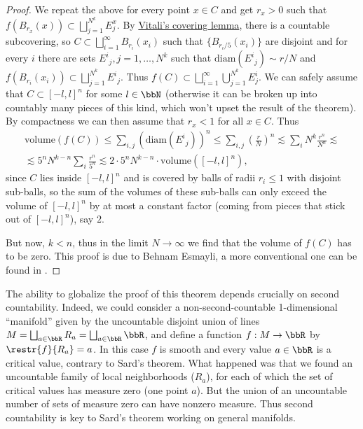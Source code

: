 \begin{proof}
    We repeat the above for every point $x\in C$ and get $r_x>0$ such that $f(B_{r_x}(x))\subset \bigsqcup_{j=1}^{N^k}E_j^x$. By \href{https://en.wikipedia.org/wiki/Vitali_covering_lemma}{Vitali's covering lemma}, there is a countable subcovering, so $C\subset \bigsqcup_{i=1}^\infty B_{r_i}(x_i)$ such that $\{B_{r_i/5}(x_i)\}$ are disjoint and for every $i$ there are sets $E^i{}_j,j=1,\ldots,N^k$ such that $\mathrm{diam}(E^i{}_j)\sim r/N$ and $f(B_{r_i}(x_i))\subset \bigsqcup_{j=1}^{N^k}E^i{}_j$. Thus $f(C)\subset \bigsqcup_{i=1}^\infty\bigcup_{j=1}^{N^k}E_j^i$. We can safely assume that $C\subset [-l,l]^n$ for some $l\in \bbN$ (otherwise it can be broken up into countably many pieces of this kind, which won't upset the result of the theorem). By compactness we can then assume that $r_x<1$ for all $x\in C$. Thus
    \begin{multline}
        \mathrm{volume}(f(C))\leq \sum_{i,j}(\mathrm{diam}(E^i{}_j))^n\leq \sum_{i,j}\left(\frac rN\right)^n\lesssim \sum_{i}N^k\frac{r^n}{N^n}\lesssim \\
        \lesssim 5^nN^{k-n}\sum_i\frac{r^n}{5^n}\lesssim 2\cdot 5^n N^{k-n}\cdot \mathrm{volume}([-l,l]^n),
    \end{multline}
    since $C$ lies inside $[-l,l]^n$ and is covered by balls of radii $r_i\leq 1$ with disjoint sub-balls, so the sum of the volumes of these sub-balls can only exceed the volume of $[-l,l]^n$ by at most a constant factor (coming from pieces that stick out of $[-l,l]^n$), say $2$.

    But now, $k<n$, thus in the limit $N\to \infty$ we find that the volume of $f(C)$ has to be zero. This proof is due to Behnam Esmayli, a more conventional one can be found in \cite[Thm.~6.10]{Lee}.
\end{proof}
\begin{rem}
    The ability to globalize the proof of this theorem depends crucially on second countability. Indeed, we could consider a non-second-countable 1-dimensional ``manifold'' given by the uncountable disjoint union of lines $M=\bigsqcup_{a\in \bbR} R_a=\bigsqcup_{a\in \bbR} \bbR$, and define a function $f:M\to \bbR$ by $\restr{f}{R_a}=a$. In this case $f$ is smooth and every value $a\in\bbR$ is a critical value, contrary to Sard's theorem. What happened was that we found an uncountable family of local neighborhoods ($R_a$), for each of which the set of critical values has measure zero (one point $a$). But the union of an uncountable number of sets of measure zero can have nonzero measure. Thus second countability is key to Sard's theorem working on general manifolds.
\end{rem}






